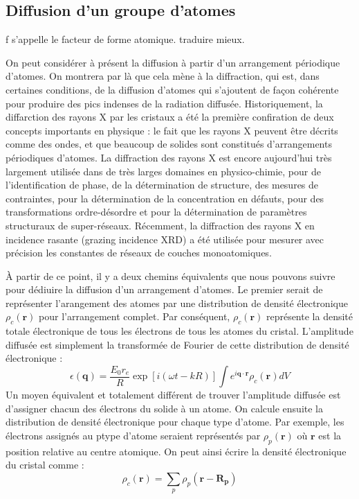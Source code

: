 \subsection{Diffusion d'un groupe d'atomes}

\TODO f s'appelle le facteur de forme atomique. traduire mieux.


On peut considérer à présent la diffusion à partir d'un arrangement périodique
d'atomes. On montrera par là que cela mène à la diffraction, qui est, dans
certaines conditions, de la diffusion d'atomes qui s'ajoutent de façon cohérente
pour produire des pics indenses de la radiation diffusée.
Historiquement, la diffarction des rayons X par les cristaux a été la première
confiration de deux concepts importants en physique : le fait que les rayons X
peuvent être décrits comme des ondes, et que beaucoup de solides sont constitués
d'arrangements périodiques d'atomes. La diffraction des rayons X est encore
aujourd'hui très largement utilisée dans de très larges domaines en
physico-chimie, pour de l'identification de phase, de la détermination de
structure, des mesures de contraintes, pour la détermination de la concentration
en défauts, pour des transformations ordre-désordre et pour la détermination de
paramètres structuraux de super-réseaux. Récemment, la diffraction des rayons X
en incidence rasante (grazing incidence XRD) a été utilisée pour mesurer avec
précision les constantes de réseaux de couches monoatomiques.

À partir de ce point, il y a deux chemins équivalents que nous pouvons suivre
pour dédiuire la diffusion d'un arrangement d'atomes. Le premier serait de
représenter l'arangement des atomes par une distribution de densité électronique
$\rho_c(\mathbf{r})$ pour l'arrangement complet. Par conséquent,
$\rho_c(\mathbf{r})$ représente la densité totale électronique de tous les
électrons de tous les atomes du cristal. L'amplitude diffusée est simplement la
transformée de Fourier de cette distribution de densité électronique :
\begin{equation}
    \epsilon(\mathbf{q}) = \frac{E_0 r_e}{R} \exp [i(\omega t - k R)] \int e^{i \mathbf{q \cdot r}} \rho_c (\mathbf{r}) dV
    \label{fftdistrelec}
\end{equation}
Un moyen équivalent et totalement différent de trouver l'amplitude diffusée est
d'assigner chacun des électrons du solide à un atome. On calcule ensuite la
distribution de densité électronique pour chaque type d'atome. Par exemple, les
électrons assignés au p\ieme type d'atome seraient représentés par
$\rho_p(\mathbf{r})$ où $\mathbf{r}$ est la position relative au centre atomique.
On peut ainsi écrire la densité électronique du cristal comme :
\begin{equation}
    \rho_c(\mathbf{r}) = \sum_p \rho_p(\mathbf{r - R_p})
    \label{densiteelectroniquecristal}
\end{equation}

